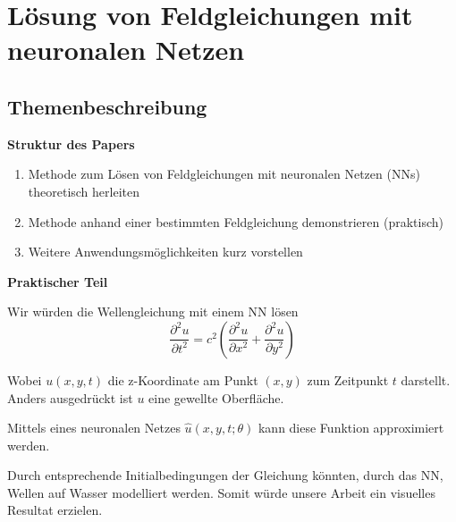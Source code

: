 %
%
%
%
\chapter{Lösung von Feldgleichungen mit neuronalen Netzen\label{chapter:neuronal}}
\begin{refsection}

\section{Themenbeschreibung}
\textbf{Struktur des Papers}
\begin{enumerate}
    \item Methode zum Lösen von Feldgleichungen mit neuronalen Netzen (NNs) theoretisch herleiten
    \item Methode anhand einer bestimmten Feldgleichung demonstrieren (praktisch)
    \item Weitere Anwendungsmöglichkeiten kurz vorstellen\newline
\end{enumerate}

\textbf{Praktischer Teil}

Wir würden die Wellengleichung mit einem NN lösen
\begin{equation}
    \frac{\partial^2 u}{\partial t^2} = c^2 \left( \frac{\partial^2 u}{\partial x^2} + \frac{\partial^2 u}{\partial y^2} \right)
\end{equation}


Wobei \( u(x, y, t) \) die z-Koordinate am Punkt \( (x, y) \) zum Zeitpunkt \( t \) darstellt.
Anders ausgedrückt ist \( u \) eine gewellte Oberfläche.

Mittels eines neuronalen Netzes \( \hat{u}(x, y, t; \theta) \) kann diese Funktion approximiert werden.\newline

Durch entsprechende Initialbedingungen der Gleichung könnten, durch das NN, Wellen auf Wasser modelliert werden.
Somit würde unsere Arbeit ein visuelles Resultat erzielen.\newline


\end{refsection}
